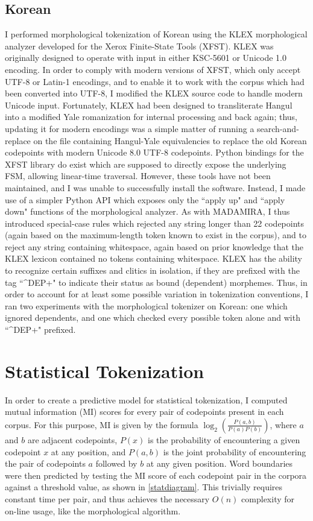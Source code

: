 \subsection{Korean}
I performed morphological tokenization of Korean using the KLEX morphological analyzer developed for the Xerox Finite-State Tools (XFST). KLEX was originally designed to operate with input in either KSC-5601 or Unicode 1.0 encoding. In order to comply with modern versions of XFST, which only accept UTF-8 or Latin-1 encodings, and to enable it to work with the corpus which had been converted into UTF-8, I modified the KLEX source code to handle modern Unicode input. Fortunately, KLEX had been designed to transliterate Hangul into a modified Yale romanization for internal processing and back again; thus, updating it for modern encodings was a simple matter of running a search-and-replace on the file containing Hangul-Yale equivalencies to replace the old Korean codepoints with modern Unicode 8.0 UTF-8 codepoints.
Python bindings for the XFST library do exist which are supposed to directly expose the underlying FSM, allowing linear-time traversal. However, these tools have not been maintained, and I was unable to successfully install the software. Instead, I made use of a simpler Python API which exposes only the ``apply up" and ``apply down" functions of the morphological analyzer. As with MADAMIRA, I thus introduced special-case rules which rejected any string longer than 22 codepoints (again based on the maximum-length token known to exist in the corpus), and to reject any string containing whitespace, again based on prior knowledge that the KLEX lexicon contained no tokens containing whitespace.
KLEX has the ability to recognize certain suffixes and clitics in isolation, if they are prefixed with the tag ``\^{}DEP+" to indicate their status as bound (dependent) morphemes. Thus, in order to account for at least some possible variation in tokenization conventions, I ran two experiments with the morphological tokenizer on Korean: one which ignored dependents, and one which checked every possible token alone and with ``\^{}DEP+" prefixed.

\section{Statistical Tokenization}
In order to create a predictive model for statistical tokenization, I computed mutual information (MI) scores for every pair of codepoints present in each corpus. For this purpose, MI is given by the formula $\log_2(\frac{P(a,b)}{P(a)P(b)})$, where $a$ and $b$ are adjacent codepoints, $P(x)$ is the probability of encountering a given codepoint $x$ at any position, and $P(a,b)$ is the joint probability of encountering the pair of codepoints $a$ followed by $b$ at any given position. Word boundaries were then predicted by testing the MI score of each codepoint pair in the corpora against a threshold value, as shown in \ref{statdiagram}. This trivially requires constant time per pair, and thus achieves the necessary $O(n)$ complexity for on-line usage, like the morphological algorithm.

